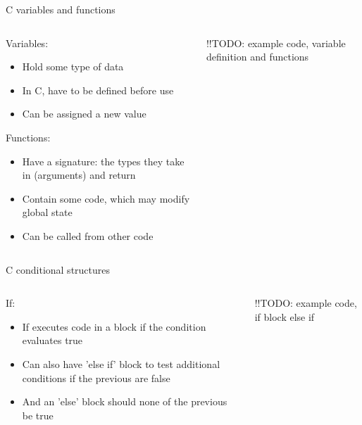 \documentclass{beamer}
\begin{document}
\begin{frame}{C variables and functions}
  \begin{columns}[T]
    \begin{column}{.6\textwidth}
      Variables:
      \begin{itemize}
        \item Hold some type of data
        \item In C, have to be defined before use
        \item Can be assigned a new value
      \end{itemize}
      Functions:
      \begin{itemize}
        \item Have a signature: the types they take in (arguments) and return
        \item Contain some code, which may modify global state
        \item Can be called from other code
      \end{itemize}
    \end{column}

    \begin{column}{0.4\textwidth}
      !!TODO: example code, variable definition and functions
    \end{column}
  \end{columns}
\end{frame}

\begin{frame}{C conditional structures}
  \begin{columns}[T]
    \begin{column}{.6\textwidth}
      If:
      \begin{itemize}
        \item If executes code in a block if the condition evaluates true
        \item Can also have 'else if' block to test additional conditions if the previous are false
        \item And an 'else' block should none of the previous be true
      \end{itemize}
    \end{column}

    \begin{column}{0.4\textwidth}
      !!TODO: example code, if block else if
    \end{column}
  \end{columns}
\end{frame}
\end{document}
